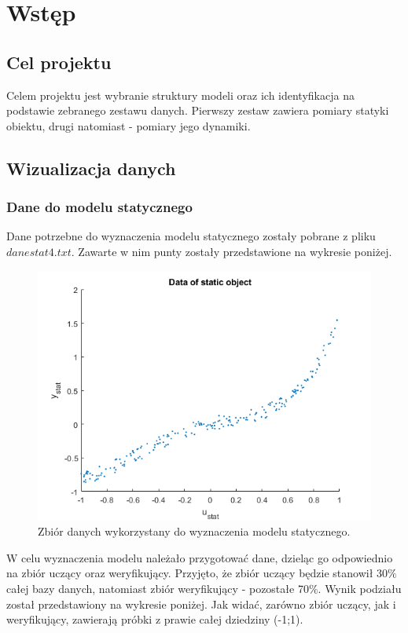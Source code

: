 \section{Wstęp}
\subsection{Cel projektu}
Celem projektu jest wybranie struktury modeli oraz ich identyfikacja na podstawie zebranego zestawu danych. Pierwszy zestaw zawiera pomiary statyki obiektu, drugi natomiast - pomiary jego dynamiki.
\subsection{Wizualizacja danych}
\subsubsection{Dane do modelu statycznego}
Dane potrzebne do wyznaczenia modelu statycznego zostały pobrane z pliku $danestat4.txt$. Zawarte w nim punty zostały przedstawione na wykresie poniżej.
\begin{figure}[H]
\centering
\includegraphics[width=15cm]{images/21.png}
\caption{Zbiór danych wykorzystany do wyznaczenia modelu statycznego.}
\label{fig:1}
\end{figure}
W celu wyznaczenia modelu należało przygotować dane, dzieląc go odpowiednio na zbiór uczący oraz weryfikujący. Przyjęto, że zbiór uczący będzie stanowił 30$\%$ całej bazy danych, natomiast zbiór weryfikujący - pozostałe 70$\%$. Wynik podziału został przedstawiony na wykresie poniżej. Jak widać, zarówno zbiór uczący, jak i weryfikujący, zawierają próbki z prawie całej dziedziny (-1;1).
